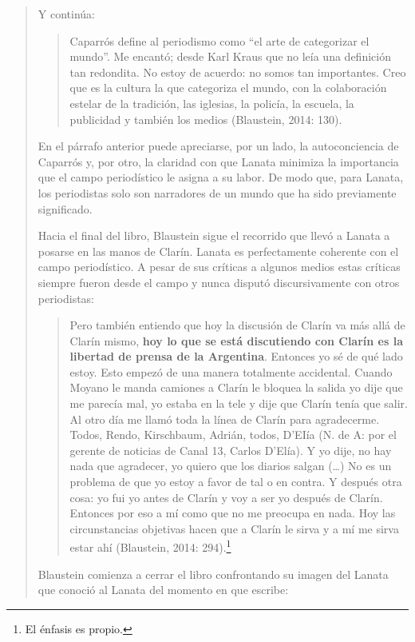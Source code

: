 \begin{quote}
Y continúa:

\begin{quote}
	Caparrós define al periodismo como \enquote{el arte de categorizar el mundo}. Me encantó; desde Karl Kraus que no leía una definición tan redondita. No estoy de acuerdo: no somos tan importantes. Creo que es la cultura la que categoriza el mundo, con la colaboración estelar de la tradición, las iglesias, la policía, la escuela, la publicidad y  también los medios (Blaustein, 2014: 130).
\end{quote}


En el párrafo anterior puede apreciarse, por un lado, la autoconciencia de Caparrós y, por otro, la claridad con que Lanata minimiza la importancia que el campo periodístico le asigna a su labor. De modo que, para Lanata, los periodistas solo son narradores de un mundo que ha sido previamente significado.

Hacia el final del libro, Blaustein sigue el recorrido que llevó a Lanata a posarse en las manos de Clarín. Lanata es perfectamente coherente con el campo periodístico. A pesar de sus críticas a algunos medios  estas críticas siempre fueron desde el campo y nunca disputó discursivamente con otros periodistas:

\begin{quote}
	Pero también entiendo que hoy la discusión de Clarín va más allá de Clarín mismo, \textbf{hoy lo que se está discutiendo con Clarín es la libertad de prensa de la Argentina}. Entonces yo sé de qué lado estoy. Esto empezó de una manera totalmente accidental. Cuando Moyano le manda camiones a Clarín le bloquea la salida yo dije que me parecía mal, yo estaba en la tele y dije que Clarín tenía que salir. Al otro día me llamó toda la línea de Clarín para agradecerme. Todos, Rendo, Kirschbaum, Adrián, todos, D'EIía (N. de A: por el gerente de noticias de Canal 13, Carlos D'Elía). Y yo dije, no hay nada que agradecer, yo quiero que los diarios salgan (\dots) No es un problema de que yo estoy a favor de tal o en contra. Y después otra cosa: yo fui yo antes de Clarín y voy a ser yo después de Clarín. Entonces por eso a mí como que no me preocupa en nada. Hoy las circunstancias objetivas hacen que a Clarín le sirva y a mí me sirva estar ahí (Blaustein, 2014: 294).\footnote{El énfasis es propio.}
\end{quote}


Blaustein comienza a cerrar el libro confrontando su imagen del Lanata que conoció al Lanata del momento en que escribe:


\end{quote}
